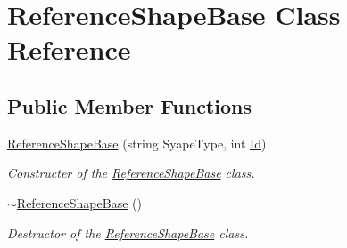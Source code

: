 \hypertarget{classReferenceShapeBase}{}\section{Reference\+Shape\+Base Class Reference}
\label{classReferenceShapeBase}
\subsection*{Public Member Functions}
\begin{DoxyCompactItemize}
\item 
\hypertarget{classReferenceShapeBase_a3d27b5bf4c591a5973b466d2af08a118}{}\hyperlink{classReferenceShapeBase_a3d27b5bf4c591a5973b466d2af08a118}{Reference\+Shape\+Base} (string Syape\+Type, int \hyperlink{classReferenceShapeBase_af0da93cee3f17800d7aa90b21b1b81c7}{Id})\label{classReferenceShapeBase_a3d27b5bf4c591a5973b466d2af08a118}

\begin{DoxyCompactList}\small\item\em Constructer of the \hyperlink{classReferenceShapeBase}{Reference\+Shape\+Base} class. \end{DoxyCompactList}\item 
\hypertarget{classReferenceShapeBase_addf60ebee57a9d3b0e345b963901e3b5}{}\hyperlink{classReferenceShapeBase_addf60ebee57a9d3b0e345b963901e3b5}{$\sim$\+Reference\+Shape\+Base} ()\label{classReferenceShapeBase_addf60ebee57a9d3b0e345b963901e3b5}

\begin{DoxyCompactList}\small\item\em Destructor of the \hyperlink{classReferenceShapeBase}{Reference\+Shape\+Base} class. \end{DoxyCompactList}\end{DoxyCompactItemize}
